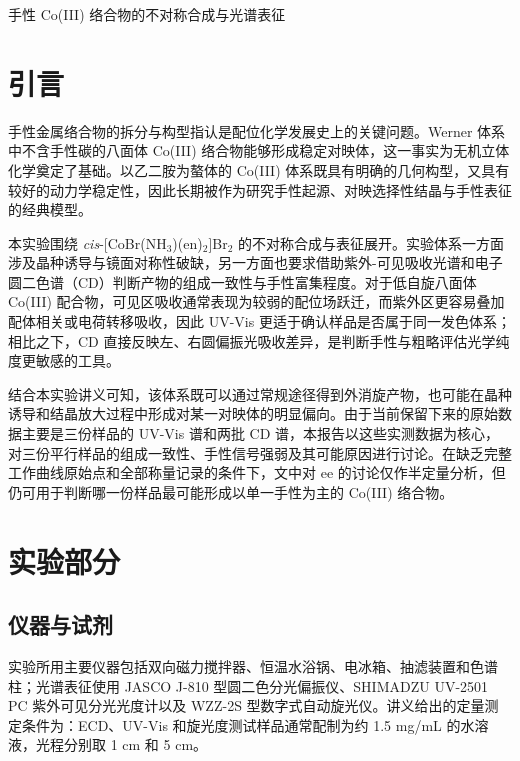 \documentclass[a4paper]{article}
\newcommand{\zihaoSan}{\fontsize{16pt}{24pt}\selectfont}
\newcommand{\zihaoWu}{\fontsize{10.5pt}{16pt}\selectfont}
\begin{document}
\zihaoWu

\begin{center}
	{\zihaoSan\heiti 手性 Co(III) 络合物的不对称合成与光谱表征}
\end{center}

\vspace{6pt}

\section{引言}
\vspace{-0.5em}

手性金属络合物的拆分与构型指认是配位化学发展史上的关键问题。Werner 体系中不含手性碳的八面体 Co(III) 络合物能够形成稳定对映体，这一事实为无机立体化学奠定了基础。以乙二胺为螯体的 Co(III) 体系既具有明确的几何构型，又具有较好的动力学稳定性，因此长期被作为研究手性起源、对映选择性结晶与手性表征的经典模型\cite{ehnbom2016,saito1968}。

本实验围绕 \textit{cis}-[CoBr(NH$_3$)(en)$_2$]Br$_2$ 的不对称合成与表征展开。实验体系一方面涉及晶种诱导与镜面对称性破缺，另一方面也要求借助紫外-可见吸收光谱和电子圆二色谱（CD）判断产物的组成一致性与手性富集程度。对于低自旋八面体 Co(III) 配合物，可见区吸收通常表现为较弱的配位场跃迁，而紫外区更容易叠加配体相关或电荷转移吸收，因此 UV-Vis 更适于确认样品是否属于同一发色体系；相比之下，CD 直接反映左、右圆偏振光吸收差异，是判断手性与粗略评估光学纯度更敏感的工具\cite{mccaffery1963,haas_libretexts}。

结合本实验讲义可知，该体系既可以通过常规途径得到外消旋产物，也可能在晶种诱导和结晶放大过程中形成对某一对映体的明显偏向。由于当前保留下来的原始数据主要是三份样品的 UV-Vis 谱和两批 CD 谱，本报告以这些实测数据为核心，对三份平行样品的组成一致性、手性信号强弱及其可能原因进行讨论。在缺乏完整工作曲线原始点和全部称量记录的条件下，文中对 ee 的讨论仅作半定量分析，但仍可用于判断哪一份样品最可能形成以单一手性为主的 Co(III) 络合物\cite{iupac_ee}。

\section{实验部分}
\vspace{-0.5em}

\subsection{仪器与试剂}

实验所用主要仪器包括双向磁力搅拌器、恒温水浴锅、电冰箱、抽滤装置和色谱柱；光谱表征使用 JASCO J-810 型圆二色分光偏振仪、SHIMADZU UV-2501 PC 紫外可见分光光度计以及 WZZ-2S 型数字式自动旋光仪。讲义给出的定量测定条件为：ECD、UV-Vis 和旋光度测试样品通常配制为约 1.5 mg/mL 的水溶液，光程分别取 1 cm 和 5 cm\cite{teaching_lab}。
\end{document}
